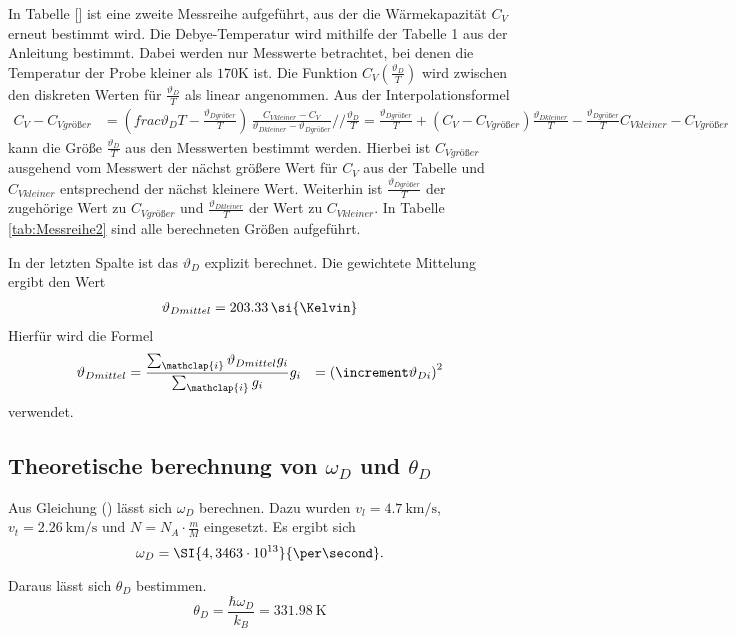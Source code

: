 
In Tabelle [] ist eine zweite Messreihe aufgeführt, aus der die Wärmekapazität $C_V$ erneut bestimmt wird.
Die Debye-Temperatur wird mithilfe der Tabelle 1 aus der Anleitung bestimmt.
Dabei werden nur Messwerte betrachtet, bei denen die Temperatur der Probe kleiner als $170 \si{\kelvin}$ ist.
Die Funktion $C_V(\frac{\vartheta_D}{T})$ wird zwischen den diskreten Werten für $\frac{\vartheta_D}{T}$ als linear angenommen.
Aus der Interpolationsformel
\begin{align}
C_V - C_{V größer} &= \left( frac{\vartheta_D}{T} - \frac{\vartheta_{D größer}}{T} \right) \, \frac{C_{V kleiner} - C_V}{\vartheta_{D kleiner}- \vartheta_{D größer}} //
\frac{\vartheta_D}{T} = \frac{\vartheta_{D größer}}{T} + \left( C_V - C_{V größer} \right) \frac{\vartheta_{D kleiner}}{T} - \frac{\vartheta_{D größer}}{T}{C_{V kleiner}- C_{V größer}}
\end{align}
kann die Größe $\frac{\vartheta_D}{T}$ aus den Messwerten bestimmt werden.
Hierbei ist $C_{V größer}$ ausgehend vom Messwert der nächst größere Wert für $C_V$ aus der Tabelle und $C_{V kleiner}$ entsprechend der
nächst kleinere Wert.
Weiterhin ist $\frac{\vartheta_{D größer}}{T}$ der zugehörige Wert zu $C_{V größer}$ und $\frac{\vartheta_{D kleiner}}{T}$ der Wert zu $C_{V kleiner}$.
In Tabelle \ref{tab:Messreihe2} sind alle berechneten Größen aufgeführt.

In der letzten Spalte ist das $\vartheta_D$ explizit berechnet.
Die gewichtete Mittelung ergibt den Wert
\begin{align}
  \vartheta_{D mittel} = 203.33 \, \si{\Kelvin}
\end{align}
Hierfür wird die Formel
\begin{align}
    \vartheta_{D mittel} &= \frac{\sum_{\mathclap{i}}  \vartheta_{D mittel} g_i}{\sum_{\mathclap{i}} g_i}
g_i &= \left( \increment \vartheta_{D i} \right) ^2
\end{align}
verwendet.

\subsection{Theoretische berechnung von $\omega_D$ und $\theta_D$}
Aus Gleichung () lässt sich $\omega_D$ berechnen. Dazu wurden
$v_l = \SI{4,7}{\kilo\meter\per\second}$, $v_t = \SI{2,26}{\kilo\meter\per\second}$
und $N=N_A \cdot \frac{m}{M}$ eingesetzt. Es ergibt sich
\begin{equation}
  \omega_D = \SI{4,3463 \cdot 10^{13}}{\per\second}.
\end{equation}

Daraus lässt sich $\theta_D$ bestimmen.
\begin{equation}
  \theta_D = \frac{\hbar\omega_D}{k_B} = \SI{331,98}{\kelvin}
\end{equation}

